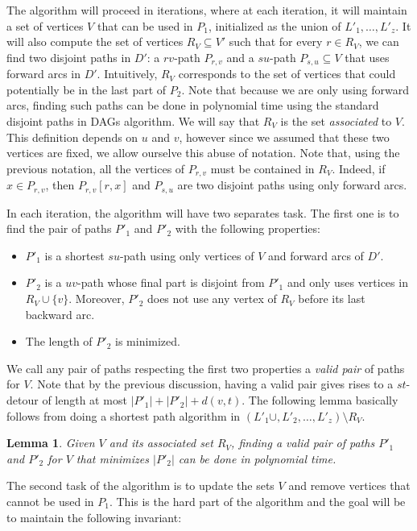 \documentclass[utf8,11pt]{article}
\theoremstyle{plain}
\newtheorem{lemma}[theorem]{Lemma}
\theoremstyle{definition}
\begin{document}
The algorithm will proceed in iterations, where at each iteration, it will maintain a set of vertices $V$ that can be used in $P_1$, initialized as the union of $L'_1, \dots, L'_{z}$. It will also compute the set of vertices $R_{V} \subseteq V'$ such that for every $r \in R_V$, we can find two disjoint paths in $D'$: a $rv$-path $P_{r,v}$ and a $su$-path $P_{s,u} \subseteq V$ that uses forward arcs in $D'$. Intuitively, $R_V$ corresponds to the set of vertices that could potentially be in the last part of $P_2$. Note that because we are only using forward arcs, finding such paths can be done in polynomial time using the standard disjoint paths in DAGs algorithm. We will say that $R_V$ is the set \textit{associated} to $V$. This definition depends on $u$ and $v$, however since we assumed that these two vertices are fixed, we allow ourselve this abuse of notation. Note that, using the previous notation, all the vertices of $P_{r,v}$ must be contained in $R_V$. Indeed, if $x \in P_{r,v}$, then $P_{r,v}[r,x]$ and $P_{s,u}$ are two disjoint paths using only forward arcs.

In each iteration, the algorithm will have two separates task. The first one is to find the pair of paths $P'_1$ and $P'_2$ with the following properties: 
\begin{itemize}
    \item $P'_1$ is a shortest $su$-path using only vertices of $V$ and forward arcs of $D'$.
    \item $P'_2$ is a $uv$-path whose final part is disjoint from $P'_1$ and only uses vertices in $R_V \cup \{v\}$. Moreover, $P'_2$ does not use any vertex of $R_V$ before its last backward arc.
    \item The length of $P'_2$ is minimized.
\end{itemize}
We call any pair of paths respecting the first two properties a \textit{valid pair} of paths for $V$. Note that by the previous discussion, having a valid pair gives rises to a $st$-detour of length at most $|P'_1| + |P'_2| + d(v,t)$. The following lemma basically follows from doing a shortest path algorithm in $(L'_1 \cup, L'_2, \dots, L'_{z} )\setminus R_V$. 

\begin{lemma}\label{lem:valid_pair}
    Given $V$ and its associated set $R_V$, finding a valid pair of paths $P'_1$ and $P'_2$ for $V$ that minimizes $|P'_2|$ can be done in polynomial time. 
\end{lemma}
The second task of the algorithm is to update the sets $V$ and remove vertices that cannot be used in $P_1$. This is the hard part of the algorithm and the goal will be to maintain the following invariant: 
\end{document}
